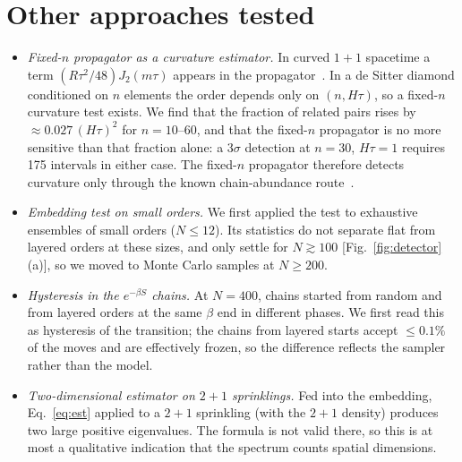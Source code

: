 \documentclass[prd,twocolumn,superscriptaddress,nofootinbib,amsmath,amssymb,floatfix]{revtex4-2}
\begin{document}
\section{Other approaches tested}\label{app:dropped}
\begin{itemize}
\item \emph{Fixed-$n$ propagator as a curvature estimator.} In curved $1+1$ spacetime a term $(R\tau^2/48)J_2(m\tau)$ appears in the propagator~\cite{NXDS17}. In a de Sitter diamond conditioned on $n$ elements the order depends only on $(n,H\tau)$, so a fixed-$n$ curvature test exists. We find that the fraction of related pairs rises by $\approx0.027\,(H\tau)^2$ for $n=10$--$60$, and that the fixed-$n$ propagator is no more sensitive than that fraction alone: a $3\sigma$ detection at $n=30$, $H\tau=1$ requires 175 intervals in either case. The fixed-$n$ propagator therefore detects curvature only through the known chain-abundance route~\cite{RSS13}.
\item \emph{Embedding test on small orders.} We first applied the test to exhaustive ensembles of small orders ($N\leq12$). Its statistics do not separate flat from layered orders at these sizes, and only settle for $N\gtrsim100$ [Fig.~\ref{fig:detector}(a)], so we moved to Monte Carlo samples at $N\geq200$.
\item \emph{Hysteresis in the $e^{-\beta S}$ chains.} At $N=400$, chains started from random and from layered orders at the same $\beta$ end in different phases. We first read this as hysteresis of the transition; the chains from layered starts accept $\leq0.1\%$ of the moves and are effectively frozen, so the difference reflects the sampler rather than the model.
\item \emph{Two-dimensional estimator on $2+1$ sprinklings.} Fed into the embedding, Eq.~\eqref{eq:est} applied to a $2+1$ sprinkling (with the $2+1$ density) produces two large positive eigenvalues. The formula is not valid there, so this is at most a qualitative indication that the spectrum counts spatial dimensions.
\end{itemize}
\end{document}
